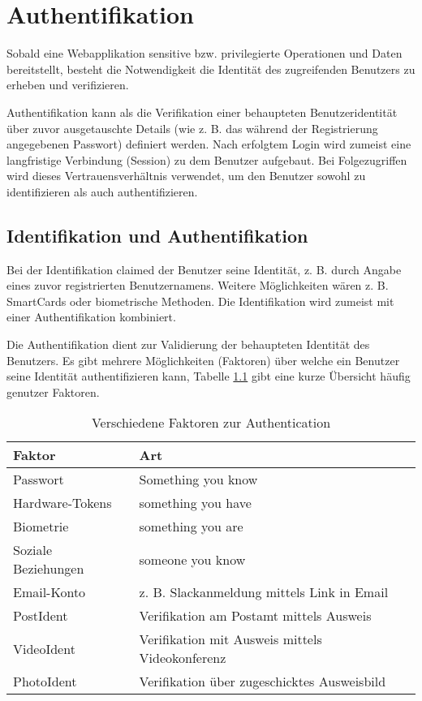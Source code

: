\chapter{Authentifikation}

Sobald eine Webapplikation sensitive bzw. privilegierte Operationen und Daten bereitstellt, besteht die Notwendigkeit die Identität des zugreifenden Benutzers zu erheben und verifizieren.

Authentifikation kann als die Verifikation einer behaupteten Benutzeridentität über zuvor ausgetauschte Details (wie z. B. das während der Registrierung angegebenen Passwort) definiert werden. Nach erfolgtem Login wird zumeist eine langfristige Verbindung (Session) zu dem Benutzer aufgebaut. Bei Folgezugriffen wird dieses Vertrauensverhältnis verwendet, um den Benutzer sowohl zu identifizieren als auch authentifizieren.

\section{Identifikation und Authentifikation}

Bei der Identifikation claimed der Benutzer seine Identität, z. B. durch Angabe eines zuvor registrierten Benutzernamens. Weitere Möglichkeiten wären z. B. SmartCards oder biometrische Methoden. Die Identifikation wird zumeist mit einer Authentifikation kombiniert.

Die Authentifikation dient zur Validierung der behaupteten Identität des Benutzers. Es gibt mehrere Möglichkeiten (Faktoren) über welche ein Benutzer seine Identität authentifizieren kann, Tabelle \ref{tbl:factors} gibt eine kurze Übersicht häufig genutzer Faktoren.

\begin{table}[h!]
	\begin{center}
\begin{tabular}{lp{7cm}}
	\toprule
	Faktor & Art\\
	\midrule
	Passwort & Something you know \\
	Hardware-Tokens & something you have \\
	Biometrie & something you are \\
	Soziale Beziehungen & someone you know \\
	Email-Konto & z. B. Slackanmeldung mittels Link in Email \\
	PostIdent & Verifikation am Postamt mittels Ausweis \\
	VideoIdent & Verifikation mit Ausweis mittels Videokonferenz \\
	PhotoIdent & Verifikation über zugeschicktes Ausweisbild \\
	\bottomrule
\end{tabular}
	\caption{Verschiedene Faktoren zur Authentication}
	\label{tbl:factors}
\end{center}
\end{table}

